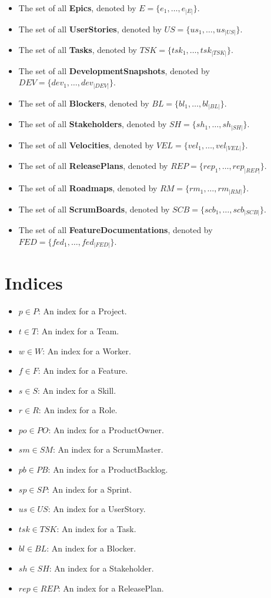 \documentclass[11pt]{article}
\begin{document}
\begin{itemize}
    \item The set of all \textbf{Epics}, denoted by $E = \{e_1, \dots, e_{|E|}\}$.
    \item The set of all \textbf{UserStories}, denoted by $US = \{us_1, \dots, us_{|US|}\}$.
    \item The set of all \textbf{Tasks}, denoted by $TSK = \{tsk_1, \dots, tsk_{|TSK|}\}$.
    \item The set of all \textbf{DevelopmentSnapshots}, denoted by $DEV = \{dev_1, \dots, dev_{|DEV|}\}$.
    \item The set of all \textbf{Blockers}, denoted by $BL = \{bl_1, \dots, bl_{|BL|}\}$.
    \item The set of all \textbf{Stakeholders}, denoted by $SH = \{sh_1, \dots, sh_{|SH|}\}$.
    \item The set of all \textbf{Velocities}, denoted by $VEL = \{vel_1, \dots, vel_{|VEL|}\}$.
    \item The set of all \textbf{ReleasePlans}, denoted by $REP = \{rep_1, \dots, rep_{|REP|}\}$.
    \item The set of all \textbf{Roadmaps}, denoted by $RM = \{rm_1, \dots, rm_{|RM|}\}$.
    \item The set of all \textbf{ScrumBoards}, denoted by $SCB = \{scb_1, \dots, scb_{|SCB|}\}$.
    \item The set of all \textbf{FeatureDocumentations}, denoted by $FED = \{fed_1, \dots, fed_{|FED|}\}$.
\end{itemize}

\section{Indices}
\begin{itemize}
    \item $p \in P$: An index for a Project.
    \item $t \in T$: An index for a Team.
    \item $w \in W$: An index for a Worker.
    \item $f \in F$: An index for a Feature.
    \item $s \in S$: An index for a Skill.
    \item $r \in R$: An index for a Role.
    \item $po \in PO$: An index for a ProductOwner.
    \item $sm \in SM$: An index for a ScrumMaster.
    \item $pb \in PB$: An index for a ProductBacklog.
    \item $sp \in SP$: An index for a Sprint.
    \item $us \in US$: An index for a UserStory.
    \item $tsk \in TSK$: An index for a Task.
    \item $bl \in BL$: An index for a Blocker.
    \item $sh \in SH$: An index for a Stakeholder.
    \item $rep \in REP$: An index for a ReleasePlan.
\end{itemize}
\end{document}
